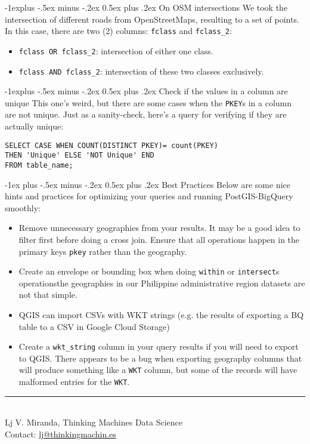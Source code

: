 \documentclass[10pt,landscape]{article}
\makeatletter
\renewcommand{\section}{\@startsection{section}{1}{0mm}%
                                {-1ex plus -.5ex minus -.2ex}%
                                {0.5ex plus .2ex}%
                                {\normalfont\large\bfseries}}
\renewcommand{\subsection}{\@startsection{subsection}{2}{0mm}%
                                {-1explus -.5ex minus -.2ex}%
                                {0.5ex plus .2ex}%
                                {\normalfont\normalsize\bfseries}}
\makeatother
\begin{document}
\begin{multicols}{3}
\subsection{On OSM intersections} We took the intersection of
different roads from OpenStreetMaps, resulting to a set of points. In this
case, there are two (2) columns: \texttt{fclass} and \texttt{fclass\_2}:

\begin{itemize}
    \item \texttt{fclass OR fclass\_2}: intersection of either one class. 
    \item \texttt{fclass AND fclass\_2}: intersection of these two classes
        exclusively.
\end{itemize}

\subsection{Check if the values in a column are unique} This one's weird, but
there are some cases when the \texttt{PKEY}s in a column are not unique. Just
as a sanity-check, here's a query for verifying if they are actually unique:

\begin{lstlisting}
SELECT CASE WHEN COUNT(DISTINCT PKEY)= count(PKEY)
THEN 'Unique' ELSE 'NOT Unique' END
FROM table_name;
\end{lstlisting}


\section{Best Practices}
Below are some nice hints and practices for optimizing your queries and running
PostGIS-BigQuery smoothly:

\begin{itemize}
    \item Remove unnecessary geographies from your results. It may be a good
        idea to filter first before doing a cross join. Ensure that all operations happen in the primary keys \texttt{pkey}
        rather than the geography.
    \item Create an envelope or bounding box when doing \texttt{within} or
        \texttt{intersect}s operations\textemdash the geographies in our
        Philippine administrative region datasets are not that simple. 
    \item QGIS can import CSVs with WKT strings (e.g. the results of exporting
        a BQ table to a CSV in Google Cloud Storage)
    \item Create a \texttt{wkt\_string} column in your query results if you
        will need to export to QGIS. There appears to be a bug when exporting
        geography columns that will produce something like a \texttt{WKT}
        column, but some of the records will have malformed entries for the
        \texttt{WKT}. 
\end{itemize}


\nocite{*}


    
\vfill
\hrule
~\\
Lj V. Miranda, Thinking Machines Data Science\\
Contact: \href{mailto:lj@thinkingmachin.es}{lj@thinkingmachin.es}
\end{multicols}
\end{document}
